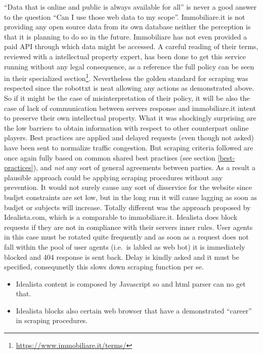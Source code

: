 \documentclass[
  12pt,
  a4paper,
  oneside]{book}
\DeclareRobustCommand{\href}[2]{#2\footnote{\url{#1}}}
\providecommand{\tightlist}{%
  \setlength{\itemsep}{0pt}\setlength{\parskip}{0pt}}
\theoremstyle{definition}
\theoremstyle{definition}
\theoremstyle{definition}
\theoremstyle{remark}
\begin{document}
``Data that is online and public is always available for all'' is never a good answer to the question ``Can I use those web data to my scope''. Immobiliare.it is not providing any open source data from its own database neither the perception is that it is planning to do so in the future. Immobiliare has not even provided a paid API through which data might be accessed.
A careful reading of their terms, reviewed with a intellectual property expert, has been done to get this service running without any legal consequence, as a reference the full policy can be seen in their \href{https://www.immobiliare.it/terms/}{specialized section}. Nevertheless the golden standard for scraping was respected since the robottxt is neat allowing any actions as demonstrated above. So if it might be the case of misinterpretation of their policy, it will be also the case of lack of communication between servers response and immobiliare.it intent to preserve their own intellectual property.
What it was shockingly surprising are the low barriers to obtain information with respect to other counterpart online players. Best practices are applied and delayed requests (even though not asked) have been sent to normalize traffic congestion. But scraping criteria followed are once again fully based on common shared best practises (see section \ref{best-practices}), and \emph{not} any sort of general agreements between parties. As a result a plausible approach could be applying scraping procedures without any prevention. It would not surely cause any sort of disservice for the website since budjet constraints are set low, but in the long run it will cause lagging as soon as budjet or subjects will increase. Totally different was the approach proposed by Idealista.com, which is a comparable to immobiliare.it. Idealista does block requests if they are not in compliance with their servers inner rules. User agents in this case must be rotated quite frequently and as soon as a request does not fall within the pool of user agents (i.e.~is labled as web bot) it is immediately blocked and 404 response is sent back. Delay is kindly asked and it must be specified, consequnetly this slows down scraping function per se.

\begin{itemize}
\tightlist
\item
  Idealista content is composed by Javascript so and html parser can no get that.
\item
  Idealista blocks also certain web browser that have a demonstrated ``career'' in scraping procedures.
\end{itemize}
\end{document}

